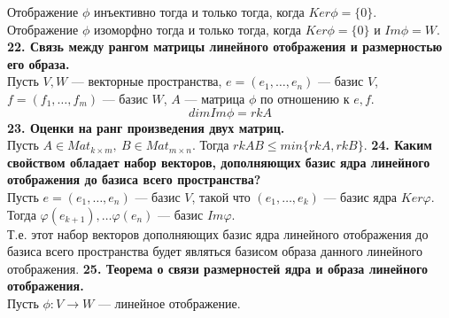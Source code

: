\documentclass{article}
\begin{document}
Отображение $\phi$ инъективно тогда и только тогда, когда $Ker \phi = \{0\}$.\\
Отображение $\phi$ изоморфно тогда и только тогда, когда $Ker \phi = \{0\}$ и $Im\phi = W$.
\newline
\newline
\textbf{22. Связь между рангом матрицы линейного отображения и размерностью его образа.}\\
Пусть $V, W$ --- векторные пространства, $e = (e_1, \ldots, e_n)$ --- базис $V$, $f= (f_1, \ldots, f_m)$ --- базис $W$, $A$ --- матрица $\phi$ по отношению к $e, f$.
$$dimIm\phi = rkA$$
\newline
\newline
\textbf{23. Оценки на ранг произведения двух матриц.}\\
Пусть $A \in Mat_{k\times m},\ B\in Mat_{m\times n}$. Тогда $rk AB \leqslant min\{rk A, rk B\}$.
\newline
\newline
\textbf{24. Каким свойством обладает набор векторов, дополняющих базис ядра линейного отображения до базиса всего пространства?}\\
Пусть  $e = (e_1, \ldots, e_n)$ --- базис $V$, такой что $(e_1, \ldots, e_k)$ --- базис ядра $Ker\varphi$. Тогда $\varphi(e_{k+1}),\ldots\varphi(e_n)$ --- базис $Im\varphi$.\\
Т.е. этот набор векторов дополняющих базис ядра линейного отображения до базиса всего пространства будет являться базисом образа данного линейного отображения.
\newline
\newline
\textbf{25. Теорема о связи размерностей ядра и образа линейного отображения.}\\
Пусть $\phi\colon V \rightarrow W$ --- линейное отображение.
\end{document}
